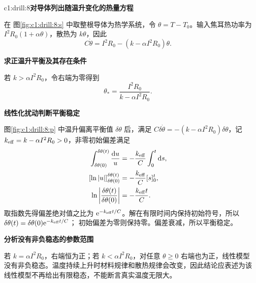 \begin{drillsolution}{c1:drill:8}\textbf{对导体列出随温升变化的热量方程}\par\nobreak
在 图\ref{fig:c1:drill:8:s} 中取整根导体为热学系统，令 $\theta=T-T_0$。输入焦耳热功率为 $I^2R_0(1+\alpha\theta)$，散热为 $k\theta$，因此
\[
 C\dot\theta=I^2R_0-(k-\alpha I^2R_0)\theta.
\]


\par\medskip{}\noindent\textbf{求正温升平衡及其存在条件}\par\nobreak
若 $k>\alpha I^2R_0$，令右端为零得到
\[
 \theta_*=\frac{I^2R_0}{k-\alpha I^2R_0}.
\]



\par\medskip{}\noindent\textbf{线性化扰动判断平衡稳定}\par\nobreak
图\ref{fig:c1:drill:8:p} 中温升偏离平衡值 $\delta\theta$ 后，满足 $C\delta\dot\theta=-(k-\alpha I^2R_0)\delta\theta$，记 $k_{\rm eff}=k-\alpha I^2R_0>0$，非零初始偏差满足
\[
 \begin{aligned}
 \int_{\delta\theta(0)}^{\delta\theta(t)}\frac{\mathop{}\!\mathrm d u}{u}
 &=-\frac{k_{\rm eff}}C\int_0^t\mathop{}\!\mathrm d s,\\
 [\ln|u|]_{\delta\theta(0)}^{\delta\theta(t)}
 &=-\frac{k_{\rm eff}}C[s]_0^t,\\
 \ln\left|\frac{\delta\theta(t)}{\delta\theta(0)}\right|
 &=-\frac{k_{\rm eff}t}{C}.
 \end{aligned}
\]
取指数先得偏差绝对值之比为 $\mathrm e^{-k_{\rm eff}t/C}$。解在有限时间内保持初始符号，所以 $\delta\theta(t)=\delta\theta(0)\mathrm e^{-k_{\rm eff}t/C}$；
初始偏差为零则保持零。偏差衰减，所以平衡稳定。

\par\medskip{}\noindent\textbf{分析没有非负稳态的参数范围}\par\nobreak
若 $k=\alpha I^2R_0$，右端恒为正；若 $k<\alpha I^2R_0$，对任意 $\theta\ge0$ 右端也为正，线性模型没有非负稳态。温度持续上升时材料规律和散热规律会改变，因此结论应表述为该线性模型不再给出有限稳态，不能断言真实温度无限大。\end{drillsolution}
